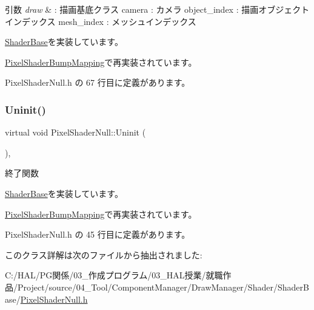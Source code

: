 \begin{DoxyParams}{引数}
{\em draw} & \+: 描画基底クラス camera \+: カメラ object\+\_\+index \+: 描画オブジェクトインデックス mesh\+\_\+index \+: メッシュインデックス \\
\hline
\end{DoxyParams}


\mbox{\hyperlink{class_shader_base_ac78c78ede3b8e48cf28b739b97456620}{Shader\+Base}}を実装しています。



\mbox{\hyperlink{class_pixel_shader_bump_mapping_afa80c2404b490a444d54cc47c681ca8f}{Pixel\+Shader\+Bump\+Mapping}}で再実装されています。



 Pixel\+Shader\+Null.\+h の 67 行目に定義があります。

\mbox{\label{class_pixel_shader_null_ae5ee2fa95e5da787918ccbd1877cd0ef}} 
\subsubsection{\texorpdfstring{Uninit()}{Uninit()}}
{\footnotesize\ttfamily virtual void Pixel\+Shader\+Null\+::\+Uninit (\begin{DoxyParamCaption}{ }\end{DoxyParamCaption})\hspace{0.3cm}{\ttfamily [inline]}, {\ttfamily [virtual]}}



終了関数 



\mbox{\hyperlink{class_shader_base_a784edfa81bec4d08a257ed4f02c61222}{Shader\+Base}}を実装しています。



\mbox{\hyperlink{class_pixel_shader_bump_mapping_a004f731db6dab6b59949baed4a5a32d7}{Pixel\+Shader\+Bump\+Mapping}}で再実装されています。



 Pixel\+Shader\+Null.\+h の 45 行目に定義があります。



このクラス詳解は次のファイルから抽出されました\+:\begin{DoxyCompactItemize}
\item 
C\+:/\+H\+A\+L/\+P\+G関係/03\+\_\+作成プログラム/03\+\_\+\+H\+A\+L授業/就職作品/\+Project/source/04\+\_\+\+Tool/\+Component\+Manager/\+Draw\+Manager/\+Shader/\+Shader\+Base/\mbox{\hyperlink{_pixel_shader_null_8h}{Pixel\+Shader\+Null.\+h}}\end{DoxyCompactItemize}
